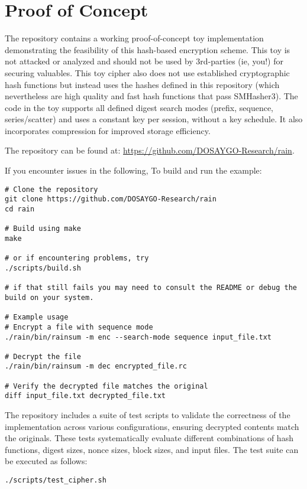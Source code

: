 \documentclass[11pt,a4paper]{article}
\begin{document}
\section*{Proof of Concept}

The repository contains a working proof-of-concept toy implementation demonstrating the feasibility of this hash-based encryption scheme. This toy is not attacked or analyzed and should not be used by 3rd-parties (ie, you!) for securing valuables. This toy cipher also does not use established cryptographic hash functions but instead uses the hashes defined in this repository (which nevertheless are high quality and fast hash functions that pass SMHasher3). The code in the toy supports all defined digest search modes (prefix, sequence, series/scatter) and uses a constant key per session, without a key schedule. It also incorporates compression for improved storage efficiency.

The repository can be found at: \url{https://github.com/DOSAYGO-Research/rain}.

If you encounter issues in the following, To build and run the example:
\begin{verbatim}
# Clone the repository
git clone https://github.com/DOSAYGO-Research/rain
cd rain

# Build using make
make

# or if encountering problems, try
./scripts/build.sh 

# if that still fails you may need to consult the README or debug the build on your system.

# Example usage
# Encrypt a file with sequence mode
./rain/bin/rainsum -m enc --search-mode sequence input_file.txt

# Decrypt the file
./rain/bin/rainsum -m dec encrypted_file.rc

# Verify the decrypted file matches the original
diff input_file.txt decrypted_file.txt
\end{verbatim}

The repository includes a suite of test scripts to validate the correctness of the implementation across various configurations, ensuring decrypted contents match the originals. These tests systematically evaluate different combinations of hash functions, digest sizes, nonce sizes, block sizes, and input files. The test suite can be executed as follows:
\begin{verbatim}
./scripts/test_cipher.sh
\end{verbatim}
\end{document}
